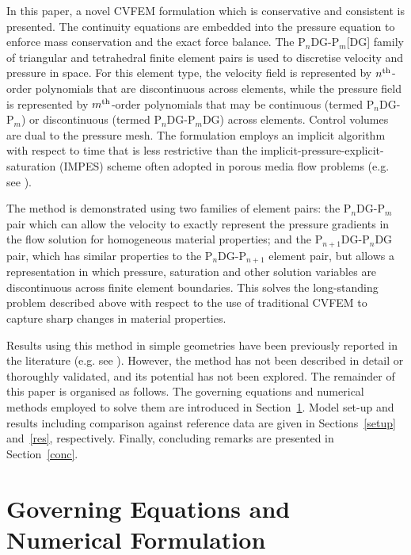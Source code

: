 \documentclass[times]{fldauth}
\newcommand{\PN}[2][error]{P$_{#1}$DG-P$_{#2}$}
\newcommand{\PNDG}[2][error]{P$_{#1}$DG-P$_{#2}$DG}
\begin{document}
In this paper, a novel CVFEM formulation which is conservative and
consistent is presented. The continuity equations are embedded into
the pressure equation to enforce mass conservation and the exact force
balance. The \PN[n]{m}[DG] family of triangular and tetrahedral finite
element pairs is used to discretise velocity and pressure in
space. For this element type, the velocity field is represented by
$n^{\rm th}$-order polynomials that are discontinuous across elements,
while the pressure field is represented by $m^{\rm th}$-order
polynomials that may be continuous (termed P$_n$DG-P$_m$) or
discontinuous (termed P$_n$DG-P$_m$DG) across elements. Control
volumes are dual to the pressure mesh. The formulation employs an
implicit algorithm with respect to time that is less restrictive than
the implicit-pressure-explicit-saturation (IMPES) scheme often adopted
in porous media flow problems (e.g. see \cite{aziz_1986, geiger_2004}).

The method is demonstrated using two families of element pairs: the
\PN[n]{m} pair which can allow the velocity to exactly represent the
pressure gradients in the flow solution for homogeneous material
properties; and the \PNDG[n+1]{n} pair, which has similar properties
to the \PN[n]{n+1} element pair, but allows a representation in which
pressure, saturation and other solution variables are discontinuous
across finite element boundaries. This solves the long-standing
problem described above with respect to the use of traditional CVFEM
to capture sharp changes in material properties.

Results using this method in simple geometries have been previously
reported in the literature
(e.g. see \cite{jackson_2015,kaisu}). However, the method has not
been described in detail or thoroughly validated, and its potential has not been
explored. The remainder of this paper is organised as follows. The
governing equations and numerical methods employed to solve them are
introduced in Section~\ref{overlapping_method_section}. Model set-up
and results including comparison against reference data are given in
Sections~\ref{setup} and~\ref{res}, respectively. Finally, 
concluding remarks are presented in Section~\ref{conc}.




\section{Governing Equations and Numerical Formulation}
\label{overlapping_method_section}
\end{document}

